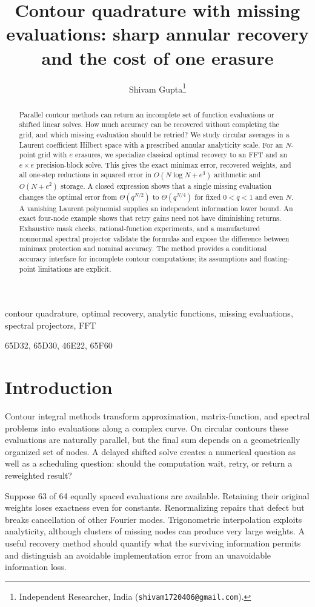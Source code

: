 \documentclass[final,leqno,letterpaper]{etna}
\title{Contour quadrature with missing evaluations: sharp annular recovery and the cost of one erasure}
\author{Shivam Gupta\thanks{Independent Researcher, India ({\tt shivam1720406@gmail.com}).}}
\begin{document}
\maketitle
\begin{abstract}
Parallel contour methods can return an incomplete set of function evaluations or shifted linear solves. How much accuracy can be recovered without completing the grid, and which missing evaluation should be retried? We study circular averages in a Laurent coefficient Hilbert space with a prescribed annular analyticity scale. For an $N$-point grid with $e$ erasures, we specialize classical optimal recovery to an FFT and an $e\times e$ precision-block solve. This gives the exact minimax error, recovered weights, and all one-step reductions in squared error in $O(N\log N+e^3)$ arithmetic and $O(N+e^2)$ storage. A closed expression shows that a single missing evaluation changes the optimal error from $\Theta(q^{N/2})$ to $\Theta(q^{N/4})$ for fixed $0<q<1$ and even $N$. A vanishing Laurent polynomial supplies an independent information lower bound. An exact four-node example shows that retry gains need not have diminishing returns. Exhaustive mask checks, rational-function experiments, and a manufactured nonnormal spectral projector validate the formulas and expose the difference between minimax protection and nominal accuracy. The method provides a conditional accuracy interface for incomplete contour computations; its assumptions and floating-point limitations are explicit.
\end{abstract}
\begin{keywords}
contour quadrature, optimal recovery, analytic functions, missing evaluations, spectral projectors, FFT
\end{keywords}
\begin{AMS}
65D32, 65D30, 46E22, 65F60
\end{AMS}
\FloatBarrier
\section{Introduction}
Contour integral methods transform approximation, matrix-function, and spectral problems into evaluations along a complex curve. On circular contours these evaluations are naturally parallel, but the final sum depends on a geometrically organized set of nodes. A delayed shifted solve creates a numerical question as well as a scheduling question: should the computation wait, retry, or return a reweighted result?

Suppose 63 of 64 equally spaced evaluations are available. Retaining their original weights loses exactness even for constants. Renormalizing repairs that defect but breaks cancellation of other Fourier modes. Trigonometric interpolation exploits analyticity, although clusters of missing nodes can produce very large weights. A useful recovery method should quantify what the surviving information permits and distinguish an avoidable implementation error from an unavoidable information loss.
\end{document}
